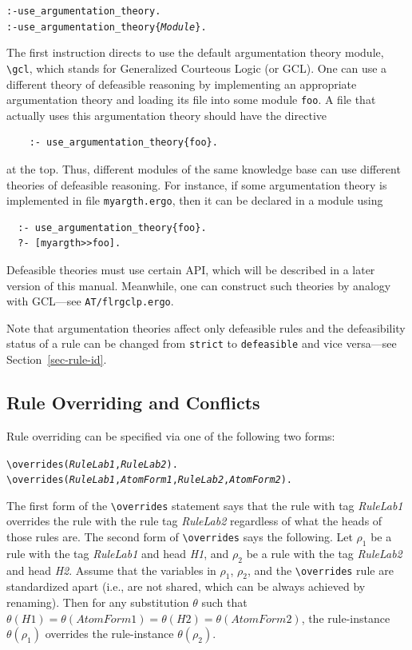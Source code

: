 \documentclass[11pt]{article}
\newcommand{\ERGO}{\mbox{\smaller{\ensuremath{\cal{E}}\smaller{{\sc{RGO}}}}}\xspace}
\newcommand{\FLSYSTEM}{\ERGO}
\newcommand{\ergoext}{ergo\xspace}
\newcommand{\bs}{\textbackslash}
\begin{document}
\begin{alltt}
  :- use_argumentation_theory.
  :- use_argumentation_theory\{\emph{Module}\}.
\end{alltt}
\index{\bs{}gcl module}
The first instruction directs \FLSYSTEM to use the default argumentation theory
module, {\tt \bs{}gcl}, which stands for Generalized Courteous Logic (or GCL).
One can use a different theory of defeasible reasoning by implementing an
appropriate argumentation theory and
loading its file into some module {\tt foo}.
A file that actually uses this argumentation theory should have
the directive
\begin{verbatim}
    :- use_argumentation_theory{foo}.
\end{verbatim}
at the top. Thus, different modules of the same \FLSYSTEM
knowledge base can use different theories of defeasible reasoning.
For instance, if some argumentation theory is implemented in file
\texttt{myargth.\ergoext}, then it can be declared in a \FLSYSTEM module
using
\begin{verbatim}
  :- use_argumentation_theory{foo}.
  ?- [myargth>>foo].
\end{verbatim}

Defeasible theories must use certain API, which will
be described in a later version of this manual. Meanwhile, one can
construct such theories by analogy with GCL---see {\tt AT/flrgclp.\ergoext}.  

Note that argumentation theories affect only defeasible rules and the
defeasibility status of a rule can be changed from \texttt{strict} to
\texttt{defeasible} and vice versa---see
Section~\ref{sec-rule-id}.

\subsection{Rule Overriding and Conflicts}\label{sec-overriding-conflict}

Rule overriding can be specified via one of the following two forms:
\index{\bs{}overrides predicate}
\begin{alltt}
  \bs{}overrides({\em{}RuleLab1},\emph{RuleLab2}).
  \bs{}overrides({\em{}RuleLab1},{\em{}AtomForm1},{\em{}RuleLab2},\emph{AtomForm2}).
\end{alltt}
The first form of the {\tt \bs{}overrides} statement says that the rule with
tag \emph{RuleLab1} overrides the rule with the rule tag
\emph{RuleLab2} regardless of what the heads of those rules are. The second
form of {\tt \bs{}overrides} says the following. Let $\rho_1$ be a 
rule with the tag \emph{RuleLab1} and head \emph{H1}, and $\rho_2$ be a
rule with the tag \emph{RuleLab2} and head \emph{H2}. Assume that
the variables in $\rho_1$, $\rho_2$, and the {\tt \bs{}overrides} rule are
standardized apart (i.e., are not shared, which can be always achieved by
renaming).   Then for any substitution $\theta$ such that $\theta(H1) =
\theta(AtomForm1) = \theta(H2) = \theta(AtomForm2)$, the rule-instance
$\theta(\rho_1)$ overrides the rule-instance $\theta(\rho_2)$.
\end{document}
